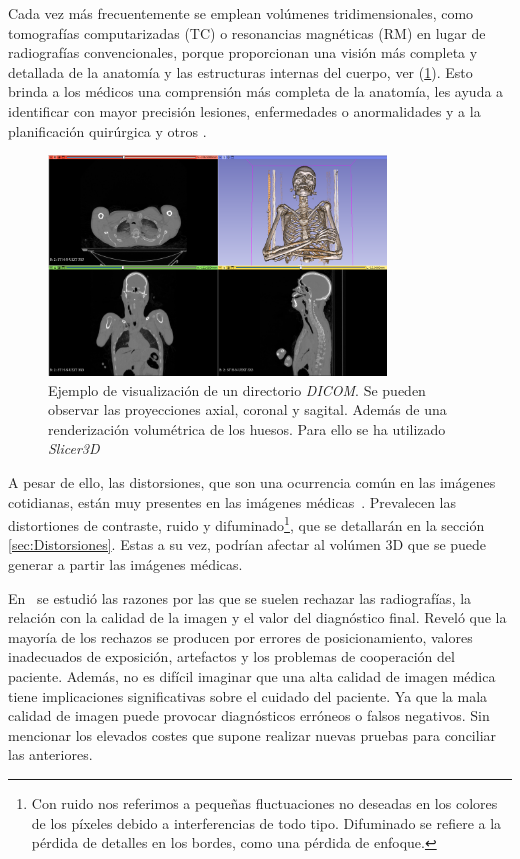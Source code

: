 Cada vez más frecuentemente se emplean volúmenes tridimensionales, como tomografías computarizadas (TC) o 
resonancias magnéticas (RM) en lugar de radiografías convencionales, porque 
proporcionan una visión más completa y detallada de la anatomía y las estructuras 
internas del cuerpo, ver (\ref{fig:SlicerVisualization}). 
Esto brinda a los médicos una comprensión más completa de la anatomía,
les ayuda a identificar con mayor precisión lesiones, enfermedades o anormalidades y a 
la planificación quirúrgica y otros
\cite{3DImagingInMedicine, 3DImagingInMedicine2, ADAS3D}.
 
\begin{figure}[htp]
  \begin{center}
    \includegraphics[width=0.8\textwidth]{imagenes/chapter1/SlicerVisualization}
  \end{center}
  \caption{Ejemplo de visualización de un directorio \emph{DICOM}. Se pueden observar
  las proyecciones axial, coronal y sagital. Además de una renderización volumétrica
  de los huesos. Para ello se ha utilizado \emph{Slicer3D}~\cite{Slicer3D}}
  \label{fig:SlicerVisualization}
\end{figure}

A pesar de ello, las distorsiones, que son una ocurrencia común en las imágenes cotidianas, 
están muy presentes en las imágenes médicas~\cite{MedicalImpactOfDistortions}.
Prevalecen las distortiones de contraste, ruido y difuminado\footnote{
  Con ruido nos referimos a pequeñas fluctuaciones no deseadas en los colores de 
  los píxeles debido a interferencias de todo tipo. Difuminado se refiere a la 
  pérdida de detalles en los bordes, como una pérdida de enfoque.
}, 
que se detallarán en la sección \ref{sec:Distorsiones}.
Estas a su vez, podrían afectar al volúmen 3D que se puede generar a partir 
las imágenes médicas. 
 
En~\cite{XrayRejectionFactor} se estudió las razones por las que se suelen 
rechazar las radiografías, la relación con la calidad de la imagen y el valor
del diagnóstico final. Reveló que la mayoría de los rechazos se producen por 
errores de posicionamiento, valores inadecuados de exposición, artefactos 
y los problemas de cooperación del paciente. 
Además, no es difícil imaginar que una alta 
calidad de imagen médica tiene implicaciones significativas sobre el cuidado
del paciente. Ya que la mala calidad de imagen puede provocar diagnósticos erróneos 
o falsos negativos. Sin mencionar los elevados costes que supone realizar 
nuevas pruebas para conciliar las anteriores.
 
